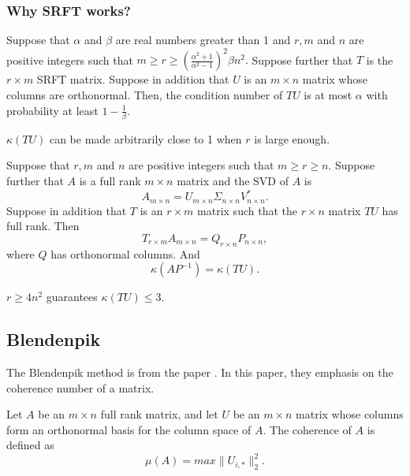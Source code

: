 
\subsubsection{Why SRFT works?}
\begin{corollary}
Suppose that $\alpha$ and $\beta$ are real numbers greater than 1 and $r,m$ and $n$ are positive integers such that $m \geq r \geq (\frac{\alpha^2 +1}{\alpha^2-1})^2 \beta n^2. $ Suppose further that $T$ is the $r \times m$ SRFT matrix. Suppose in addition that $U$ is an $m \times n$ matrix whose columns are orthonormal.
Then, the condition number of $TU$ is at most $\alpha$ with probability at least $1 - \frac{1}{\beta}. $
\end{corollary}
$\kappa(TU)$ can be made arbitrarily close to 1 when $r$ is large enough.


\begin{theorem}
Suppose that $r,m$ and $n$ are positive integers such that $m \geq r \geq n$. Suppose further that $A$ is a full rank $m \times n$ matrix and the SVD of $A$ is
$$
A_{m \times n} = U_{m \times n} \Sigma_{n \times n} V^*_{n \times n}.
$$
Suppose in addition that $T$ is an $r \times m$ matrix such that the $r \times n$ matrix $TU$ has full rank.
Then
$$
T_{r \times m} A_{m \times n} = Q_{r \times n} P_{n \times n},
$$
where $Q$ has orthonormal columns.
And
$$
\kappa(AP^{-1}) = \kappa(TU).
$$
\end{theorem}
\small{$r \geq 4n^2$ guarantees $\kappa(TU) \leq 3.$}




\subsection{Blendenpik}

The Blendenpik method is from the paper \cite{BLEN2010}. In this paper, they emphasis on the coherence number of a matrix.
\begin{definition}[Coherence]
Let $A$ be an $m \times n$ full rank matrix, and let $U$ be an $m \times n$ matrix whose columns form an orthonormal basis for the column space of $A$. The coherence of $A$ is defined as
$$
\mu(A) = max\| U_{i,*} \|_2^2.
$$
\end{definition}


